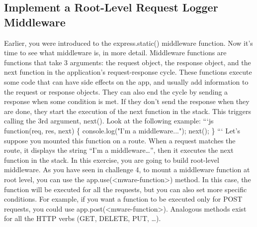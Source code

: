 \documentclass{article}%
\begin{document}
%
\subsection{Implement a Root{-}Level Request Logger Middleware}%
\label{subsec:ImplementaRoot{-}LevelRequestLoggerMiddleware}%
Earlier, you were introduced to the express.static() middleware function. Now it’s time to see what middleware is, in more detail. Middleware functions are functions that take 3 arguments: the request object, the response object, and the next function in the application’s request{-}response cycle. These functions execute some code that can have side effects on the app, and usually add information to the request or response objects. They can also end the cycle by sending a response when some condition is met. If they don’t send the response when they are done, they start the execution of the next function in the stack. This triggers calling the 3rd argument, next().\newline%
Look at the following example:\newline%
```js\newline%
function(req, res, next) \{\newline%
  console.log("I'm a middleware...");\newline%
  next();\newline%
\}\newline%
```\newline%
Let’s suppose you mounted this function on a route. When a request matches the route, it displays the string “I’m a middleware…”, then it executes the next function in the stack. \newline%
In this exercise, you are going to build root{-}level middleware. As you have seen in challenge 4, to mount a middleware function at root level, you can use the app.use(<mware{-}function>) method. In this case, the function will be executed for all the requests, but you can also set more specific conditions. For example, if you want a function to be executed only for POST requests, you could use app.post(<mware{-}function>). Analogous methods exist for all the HTTP verbs (GET, DELETE, PUT, …).\newline%

%
\end{document}

